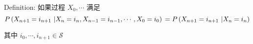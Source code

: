 \documentclass[a4paper, 10pt]{ctexart} %
\begin{document}
Definition: 如果过程 $X _{0} ,\cdots $ 满足 
$$ P \left(X _{n+1} = i_{n+1} \ | X_{n} = i_{n} , X_{n-1}= i_{n-1}, \cdots ,X_{0} = i_{0}\right)\\  =P \left(X_{n+1}= i_{n+1} \ | X_{n} = i _{n}\right)$$

其中 $i_{0} , \cdots  , i_{n+1} \in \mathcal S$
\end{document}
